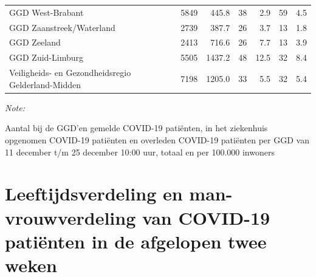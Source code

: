 \documentclass[
  english,
  man,floatsintext]{apa6}
\begin{document}
\begin{table}[H]
\begin{threeparttable}
\begin{tabular}{lrrrrrr}
GGD West-Brabant & 5849 & 445.8 & 38 & 2.9 & 59 & 4.5\\
GGD Zaanstreek/Waterland & 2739 & 387.7 & 26 & 3.7 & 13 & 1.8\\
GGD Zeeland & 2413 & 716.6 & 26 & 7.7 & 13 & 3.9\\
GGD Zuid-Limburg & 5505 & 1437.2 & 48 & 12.5 & 32 & 8.4\\
Veiligheids- en Gezondheidsregio Gelderland-Midden & 7198 & 1205.0 & 33 & 5.5 & 32 & 5.4\\
\bottomrule
\end{tabular}
\begin{tablenotes}
\item \textit{Note: } 
\item Aantal bij de GGD’en gemelde COVID-19 patiënten, in het ziekenhuis opgenomen COVID-19 patiënten en overleden COVID-19 patiënten per GGD van 11 december t/m 25 december 10:00 uur, totaal en per 100.000 inwoners
\end{tablenotes}
\end{threeparttable}
\endgroup{}
\end{table}

\newpage

\hypertarget{leeftijdsverdeling-en-man-vrouwverdeling-van-covid-19-patiuxebnten-in-de-afgelopen-twee-weken}{%
\section{Leeftijdsverdeling en man-vrouwverdeling van COVID-19 patiënten in de afgelopen twee weken}\label{leeftijdsverdeling-en-man-vrouwverdeling-van-covid-19-patiuxebnten-in-de-afgelopen-twee-weken}}
\end{document}
